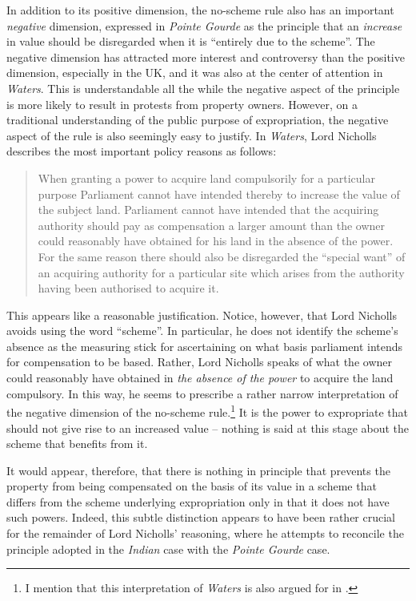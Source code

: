 In addition to its positive dimension, the no-scheme rule also has an important \emph{negative} dimension, expressed in {\it Pointe Gourde} as the principle that an {\it increase} in value should be disregarded when it is ``entirely due to the scheme''. The negative dimension has attracted more interest and controversy than the positive dimension, especially in the UK, and it was also at the center of attention in {\it Waters}. This is understandable all the while the negative aspect of the principle is more likely to result in protests from property owners. However, on a traditional understanding of the public purpose of expropriation, the negative aspect of the rule is also seemingly easy to justify. In \emph{Waters}, Lord Nicholls describes the most important policy reasons as follows:

\begin{quote}
When granting a power to acquire land compulsorily for a particular purpose Parliament cannot have intended thereby to increase the value of the subject land. Parliament cannot have intended that the acquiring authority should pay as compensation a larger amount than the owner could reasonably have obtained for his land in the absence of the power. For the same reason there should also be disregarded the ``special want'' of an acquiring authority for a particular site which arises from the authority having been authorised to acquire it.
\end{quote}

This appears like a reasonable justification. Notice, however, that Lord Nicholls avoids using the word ``scheme''. In particular, he does not identify the scheme's absence as the measuring stick for ascertaining on what basis parliament intends for compensation to be based. Rather, Lord Nicholls speaks of what the owner could reasonably have obtained in \emph{the absence of the power} to acquire the land compulsory. In this way, he seems to prescribe a rather narrow interpretation of the negative dimension of the no-scheme rule.\footnote{I mention that this interpretation of \emph{Waters} is also argued for in \cite{newuk}.} It is the power to expropriate that should not give rise to an increased value -- nothing is said at this stage about the scheme that benefits from it.

It would appear, therefore, that there is nothing in principle that prevents the property from being compensated on the basis of its value in a scheme that differs from the scheme underlying expropriation only in that it does not have such powers. Indeed, this subtle distinction appears to have been rather crucial for the remainder of Lord Nicholls' reasoning, where he attempts to reconcile the principle adopted in the \emph{Indian} case with the \emph{Pointe Gourde} case.

